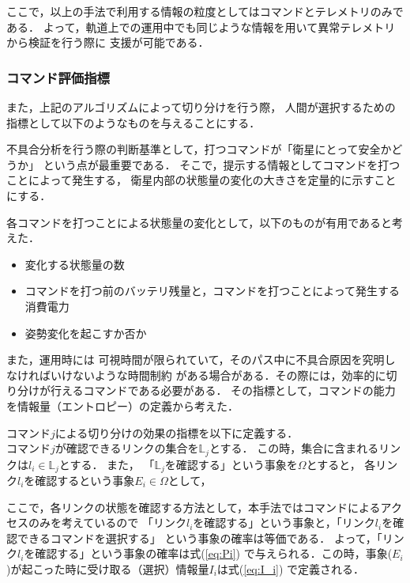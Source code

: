 \documentclass[11pt]{article}
\begin{document}
ここで，以上の手法で利用する情報の粒度としてはコマンドとテレメトリのみである．%
よって，軌道上での運用中でも同じような情報を用いて異常テレメトリから検証を行う際に
支援が可能である．

\subsubsection{コマンド評価指標}
また，上記のアルゴリズムによって切り分けを行う際，
人間が選択するための指標として以下のようなものを与えることにする．%

不具合分析を行う際の判断基準として，打つコマンドが「衛星にとって安全かどうか」
という点が最重要である．%
そこで，提示する情報としてコマンドを打つことによって発生する，
衛星内部の状態量の変化の大きさを定量的に示すことにする．

各コマンドを打つことによる状態量の変化として，以下のものが有用であると考えた．
\begin{itemize}
   \item 変化する状態量の数
   \item コマンドを打つ前のバッテリ残量と，コマンドを打つことによって発生する消費電力
   \item 姿勢変化を起こすか否か
\end{itemize}

また，運用時には
可視時間が限られていて，そのパス中に不具合原因を究明しなければいけないような時間制約
がある場合がある．その際には，効率的に切り分けが行えるコマンドである必要がある．
その指標として，コマンドの能力を情報量（エントロピー）の定義から考えた．

コマンド$j$による切り分けの効果の指標を以下に定義する．\\
コマンド$j$が確認できるリンクの集合を$\mathbb{L}_j$とする．
この時，集合に含まれるリンクは$l_i\in \mathbb{L}_j$とする．
また，
「$\mathbb{L}_j$を確認する」という事象を$\Omega$とすると，
各リンク$l_i$を確認するという事象$E_i \in \Omega$として，

ここで，各リンクの状態を確認する方法として，本手法ではコマンドによるアクセスのみを考えているので
「リンク$l_i$を確認する」という事象と，「リンク$l_i$を確認できるコマンドを選択する」
という事象の確率は等価である．%
よって，「リンク$l_i$を確認する」という事象の確率は式(\ref{eq:Pi})
で与えられる．この時，事象($E_i$)が起こった時に受け取る（選択）情報量$I_i$は式(\ref{eq:I_i})
で定義される．
\end{document}
